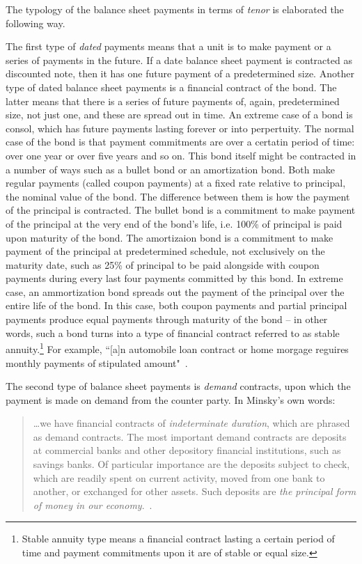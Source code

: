 The typology of the balance sheet payments in terms of \textit{tenor} is elaborated the following way. 

The first type of \textit{dated} payments means that a unit is to make payment or a series of payments in the future. If a date balance sheet payment is contracted as discounted note, then it has one future payment of a predetermined size. Another type of dated balance sheet payments is a financial contract of the bond. The latter means that there is a series of future payments of, again, predetermined size, not just one, and these are spread out in time. An extreme case of a bond is consol, which has future payments lasting forever or into perpertuity. The normal case of the bond is that payment commitments are over a certatin period of time: over one year or over five years and so on. This bond itself might be contracted in a number of ways such as a bullet bond or an amortization bond. Both make regular payments (called coupon payments) at a fixed rate relative to principal, the nominal value of the bond. The difference between them is how the payment of the principal is contracted. The bullet bond is a commitment to make payment of the principal at the very end of the bond's life, i.e. 100\% of principal is paid upon maturity of the bond. The amortizaion bond is a commitment to make payment of the principal at predetermined schedule, not exclusively on the maturity date, such as 25\% of principal to be paid alongside with coupon payments during every last four payments committed by this bond. In extreme case, an ammortization bond spreads out the payment of the principal over the entire life of the bond. In this case, both coupon payments and partial principal payments produce equal payments through maturity of the bond -- in other words, such a bond turns into a type of financial contract referred to as stable annuity.\footnote{Stable annuity type means a financial contract lasting a certain period of time and payment commitments upon it are of stable or equal size.} For example, ``[a]n automobile loan contract or home morgage reguires monthly payments of stipulated amount"~\citep[p.~224]{minsky1986}. 

The second type of balance sheet payments is \textit{demand} contracts, upon which the payment is made on demand from the counter party. In Minsky's own words: 

\begin{quote}
\dots we have financial contracts of \textit{indeterminate duration}, which are phrased as demand contracts. The most important demand contracts are deposits at commercial banks and other depository financial institutions, such as savings banks. Of particular importance are the deposits subject to check, which are readily spent on current activity, moved from one bank to another, or exchanged for other assets. Such deposits are \textit{the principal form of money in our economy}.~\citep[p.~225, emphasis added]{minsky1986}.
\end{quote}

